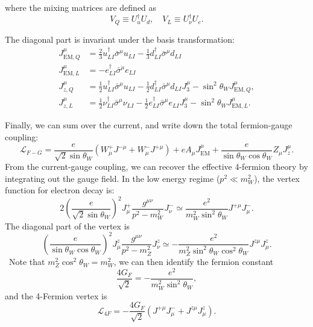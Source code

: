 where the mixing matrices are defined as
\begin{equation}
	V_Q \equiv U^\dagger_u U_d, \quad
	V_L \equiv U_\nu^\dagger U_e.
\end{equation}

The diagonal part is invariant under the basis transformation:
\begin{equation}
\begin{aligned}
	J^\mu_{\mathrm{EM},Q} &= \frac{2}{3} u_{LI}^\dagger \bar\sigma^\mu u_{LI} - \frac{1}{3} d_{LI}^\dagger \bar\sigma^\mu d_{LI} \\
	J^\mu_{\mathrm{EM},L} &= - e_{LI}^\dagger \bar\sigma^\mu e_{LI} \\
	J_{z,Q}^\mu &= \frac{1}{2} u_{LI}^\dagger \bar\sigma^\mu u_{LI} - \frac{1}{2} d_{LI}^\dagger \bar\sigma^\mu d_{LI} J^\mu_3-\sin^2{\theta_W}J_{\mathrm{EM},Q}^\mu, \\
	J_{z,L}^\mu &= \frac{1}{2} \nu_{LI}^\dagger \bar\sigma^\mu \nu_{LI} - \frac{1}{2} e_{LI}^\dagger \bar\sigma^\mu e_{LI} J^\mu_3-\sin^2{\theta_W}J_{\mathrm{EM},L}^\mu.
\end{aligned}
\end{equation}

Finally, we can sum over the current, and write down the total fermion-gauge coupling:
\begin{equation}
	\mathcal L_{F-G} = \frac{e}{\sqrt{2}\sin{\theta_W}} \left(W^{+}_\mu J^{-\mu} + W^{-}_\mu J^{+\mu} \right) + e A_\mu J^{\mu}_{\mathrm{EM}} + \frac{e}{\sin{\theta_W}\cos{\theta_W}} Z_\mu J^\mu_{z}.
\end{equation}
From the current-gauge coupling, we can recover the effective 4-fermion theory by integrating out the gauge field.
In the low energy regime ($p^2 \ll m_W^2$), the vertex function for electron decay is:
\begin{equation}
	2\left(\frac{e}{\sqrt{2}\sin{\theta_W}} \right)^2 J^+_\mu \frac{g^{\mu\nu}}{p^2-m_W^2} J^-_\nu 
	\simeq \frac{e^2}{m_W^2 \sin^2{\theta_W}} J^{+\mu} J^-_\mu.
\end{equation}
The diagonal part of the vertex is
\begin{equation}
	\left(\frac{e}{\sin{\theta_W}\cos{\theta_W}} \right)^2 J^z_\mu \frac{g^{\mu\nu}}{p^2-m_Z^2} J^z_\nu 
	\simeq -\frac{e^2}{m_Z^2 \sin^2{\theta_W}\cos^2{\theta_W}} J^{z\mu} J^z_\mu.
\end{equation}\
Note that $m_Z^2\cos^2{\theta_W} = m_W^2$, we can then identify the fermion constant
\begin{equation}
	\frac{4G_F}{\sqrt 2} = -\frac{e^2}{m_W^2 \sin^2{\theta_W}},
\end{equation}
and the 4-Fermion vertex is
\begin{equation}
	\mathcal L_{4F} = -\frac{4G_F}{\sqrt 2} \left(J^{+\mu} J_\mu^- + J^{z\mu} J_\mu^z \right).
\end{equation}
















